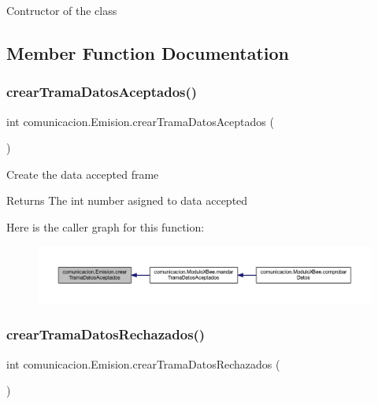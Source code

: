 Contructor of the class 

\subsection{Member Function Documentation}
\mbox{\label{classcomunicacion_1_1_emision_ac62ccb2290755183f662f8fa06ecdd52}} 
\subsubsection{\texorpdfstring{crear\+Trama\+Datos\+Aceptados()}{crearTramaDatosAceptados()}}
{\footnotesize\ttfamily int comunicacion.\+Emision.\+crear\+Trama\+Datos\+Aceptados (\begin{DoxyParamCaption}{ }\end{DoxyParamCaption})}

Create the data accepted frame \begin{DoxyReturn}{Returns}
The int number asigned to data accepted 
\end{DoxyReturn}
Here is the caller graph for this function\+:
\nopagebreak
\begin{figure}[H]
\begin{center}
\leavevmode
\includegraphics[width=350pt]{classcomunicacion_1_1_emision_ac62ccb2290755183f662f8fa06ecdd52_icgraph}
\end{center}
\end{figure}
\mbox{\label{classcomunicacion_1_1_emision_aafa487246461f3d94bb9939a0f345b50}} 
\subsubsection{\texorpdfstring{crear\+Trama\+Datos\+Rechazados()}{crearTramaDatosRechazados()}}
{\footnotesize\ttfamily int comunicacion.\+Emision.\+crear\+Trama\+Datos\+Rechazados (\begin{DoxyParamCaption}{ }\end{DoxyParamCaption})}

